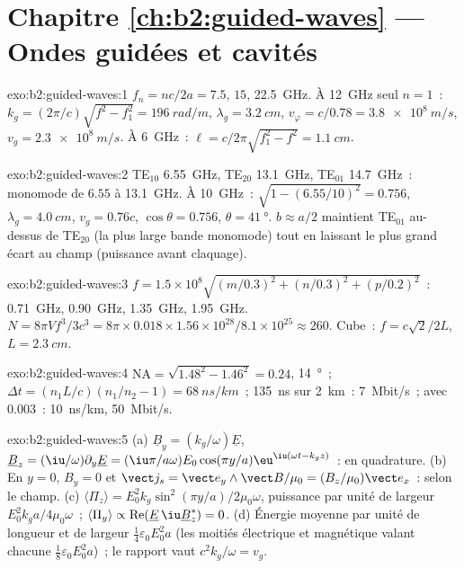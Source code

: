 \section*{Chapitre \ref{ch:b2:guided-waves} --- Ondes guidées et cavités}

\begin{solution}{exo:b2:guided-waves:1}
$f_n = nc/2a = 7.5$, $15$, \qty{22.5}{GHz}. À \qty{12}{GHz} seul $n = 1$~: $k_g =
(2\pi/c)\sqrt{f^2 - f_1^2} = \qty{196}{rad/m}$, $\lambda_g = \qty{3.2}{cm}$, $v_\varphi = c/0.78
= \qty{3.8e8}{m/s}$, $v_g = \qty{2.3e8}{m/s}$. À \qty{6}{GHz}~: $\ell = c/2\pi\sqrt{f_1^2 -
f^2} = \qty{1.1}{cm}$.
\end{solution}

\begin{solution}{exo:b2:guided-waves:2}
TE$_{10}$ \qty{6.55}{GHz}, TE$_{20}$ \qty{13.1}{GHz}, TE$_{01}$ \qty{14.7}{GHz}~: monomode
de $6.55$ à \qty{13.1}{GHz}. À \qty{10}{GHz}~: $\sqrt{1 - (6.55/10)^2} =
0.756$, $\lambda_g = \qty{4.0}{cm}$, $v_g = 0.76c$, $\cos\theta = 0.756$, $\theta = \qty{41}{\degree}$.
$b \approx a/2$ maintient TE$_{01}$ au-dessus de TE$_{20}$ (la plus large bande monomode)
tout en laissant le plus grand écart au champ (puissance avant claquage).
\end{solution}

\begin{solution}{exo:b2:guided-waves:3}
$f = 1.5 \times 10^8\sqrt{(m/0.3)^2 + (n/0.3)^2 + (p/0.2)^2}$~: \qty{0.71}{GHz}, \qty{0.90}{GHz},
\qty{1.35}{GHz}, \qty{1.95}{GHz}. $N = 8\pi Vf^3/3c^3 = 8\pi \times 0.018 \times 1.56 \times 10^{28}/
8.1 \times 10^{25} \approx 260$. Cube~: $f = c\sqrt2/2L$, $L = \qty{2.3}{cm}$.
\end{solution}

\begin{solution}{exo:b2:guided-waves:4}
$\mathrm{NA} = \sqrt{1.48^2 - 1.46^2} = 0.24$, \qty{14}{\degree}~; $\Delta t = (n_1L/c)(n_1/n_2
- 1) = \qty{68}{ns/km}$~; \qty{135}{ns} sur \qty{2}{km}~: \qty{7}{Mbit/s}~; avec $0.003$~:
\qty{10}{ns/km}, \qty{50}{Mbit/s}.
\end{solution}

\begin{solution}{exo:b2:guided-waves:5}
(a) $\underline B_y = (k_g/\omega)\underline E$, $\underline B_z = (\iu/\omega)\partial_y\underline E = (\iu\pi/a\omega)
E_0\cos(\pi y/a)\eu^{\iu(\omega t - k_gz)}$~: en quadrature. (b) En $y = 0$, $B_y = 0$ et
$\vect j_s = \vect e_y\wedge\vect B/\mu_0 = (B_z/\mu_0)\vect e_x$~: selon le champ. (c)
$\langle\Pi_z\rangle = E_0^2k_g\sin^2(\pi y/a)/2\mu_0\omega$, puissance par unité de largeur
$E_0^2k_ga/4\mu_0\omega$~; $\langle\Pi_y\rangle \propto \operatorname{Re}(\underline E\,\iu\underline B_z^*)
= 0$. (d) Énergie moyenne par unité de longueur et de largeur $\tfrac14\varepsilon_0E_0^2a$ (les moitiés électrique
et magnétique valant chacune $\tfrac18\varepsilon_0E_0^2a$)~; le rapport vaut $c^2k_g/\omega = v_g$.
\end{solution}

